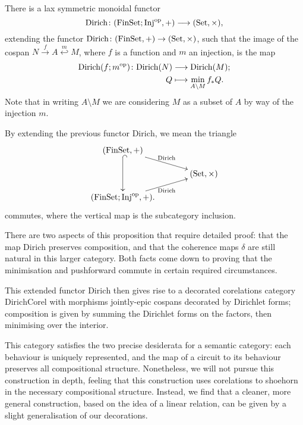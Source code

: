 \begin{proposition}
  There is a lax symmetric monoidal functor
\[
  \mathrm{Dirich}{\colon} (\mathrm{FinSet};\mathrm{Inj}^{\mathrm{op}},+) \longrightarrow
  (\mathrm{Set},\times),
\]
extending the functor $\mathrm{Dirich} {\colon} (\mathrm{FinSet},+) \rightarrow
(\mathrm{Set},\times)$, such that the image of the cospan $N \stackrel{f}\to A
\stackrel{m}\hookleftarrow M$, where $f$ is a function and $m$ an injection, is the
map
\begin{align*}
  \mathrm{Dirich}(f;m^{\mathrm{op}}){\colon} \mathrm{Dirich}(N) &\longrightarrow
  \mathrm{Dirich}(M);\\
  Q &\longmapsto \min_{A\setminus M} f_\ast Q.
\end{align*}
Note that in writing $A \setminus M$ we are considering $M$ as a subset of $A$
by way of the injection $m$.

\end{proposition} 
By extending the previous functor $\mathrm{Dirich}$, we mean the triangle
\[
  \xymatrixcolsep{3pc}
  \xymatrixrowsep{1pc}
  \xymatrix{
    (\FinSet, +) \ar[dr]^{\mathrm{Dirich}} \ar@{^{(}->}[dd] \\
    & (\Set,\times) \\
 (\mathrm{FinSet};\mathrm{Inj}^\opp,+) \ar[ur]_{\mathrm{Dirich}}.
  }
\]
commutes, where the vertical map is the subcategory inclusion.

There are two aspects of this proposition that require detailed proof: that the
map $\mathrm{Dirich}$ preserves composition, and that the coherence maps
$\delta$ are still natural in this larger category. Both facts come down to
proving that the minimisation and pushforward commute in certain required circumstances. 

This extended functor $\mathrm{Dirich}$ then gives rise to a decorated
corelations category $\mathrm{DirichCorel}$ with morphisms jointly-epic cospans
decorated by Dirichlet forms; composition is given by summing the Dirichlet
forms on the factors, then minimising over the interior.

This category satisfies the two precise desiderata for a semantic category: each
behaviour is uniquely represented, and the map of a circuit to its behaviour
preserves all compositional structure. Nonetheless, we will not pursue this
construction in depth, feeling that this construction uses corelations to
shoehorn in the necessary compositional structure. Instead, we find that a
cleaner, more general construction, based on the idea of a linear relation, can
be given by a slight generalisation of our decorations.

